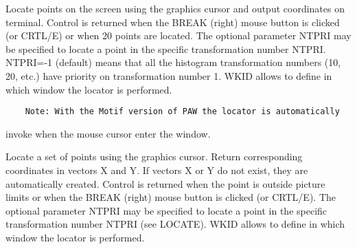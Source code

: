    \par
Locate points on the screen using the graphics cursor and output 
   coordinates on terminal.  Control is returned when the BREAK (right) mouse 
   button is clicked (or CRTL/E) or when 20 points are located.  The optional 
   parameter NTPRI may be specified to locate a point in the specific 
   transformation number NTPRI.  NTPRI=-1 (default) means that all the 
   histogram transformation numbers (10, 20, etc.) have priority on 
   transformation number 1.  WKID allows to define in which window the locator 
   is performed.  
\begin{verbatim}
    Note: With the Motif version of PAW the locator is automatically
\end{verbatim}
   \par
invoke when the mouse cursor enter the window.  

\ENDCMD


\BEGARG
{}
\ENDARG
{}
\ENDOPT

   \par
Locate a set of points using the graphics cursor.  Return corresponding 
   coordinates in vectors X and Y.  If vectors X or Y do not exist, they are 
   automatically created.  Control is returned when the point is outside 
   picture limits or when the BREAK (right) mouse button is clicked (or 
   CRTL/E).  The optional parameter NTPRI may be specified to locate a point 
   in the specific transformation number NTPRI (see LOCATE).  WKID allows to 
   define in which window the locator is performed.  

